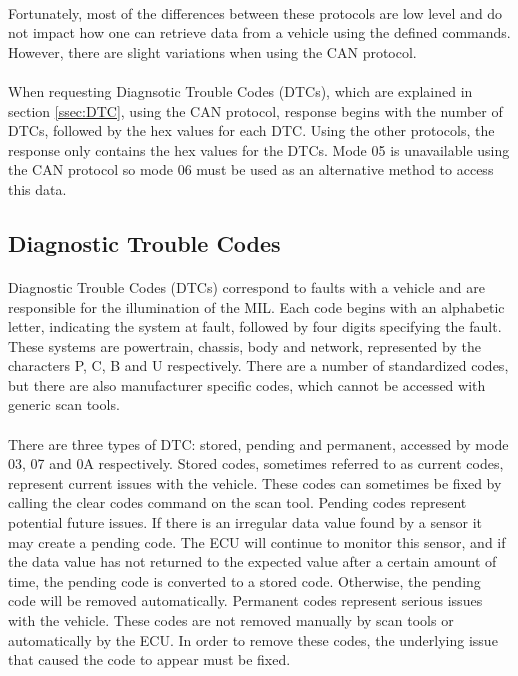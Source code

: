 {		\paragraph{}{
		Fortunately, most of the differences between these protocols are low level and do not impact how one can retrieve data from a vehicle using the defined commands. However, there are slight variations when using the CAN protocol.
		}
		\paragraph{}{
		 When requesting Diagnsotic Trouble Codes (DTCs), which are explained in section \ref{ssec:DTC}, using the CAN protocol, response begins with the number of DTCs, followed by the hex values for each DTC. Using the other protocols, the response only contains the hex values for the DTCs. Mode 05 is unavailable using the CAN protocol so mode 06 must be used as an alternative method to access this data.
		}	
	}
	\subsection{Diagnostic Trouble Codes}{
		\paragraph{}{
		Diagnostic Trouble Codes (DTCs) correspond to faults with a vehicle and are responsible for the illumination of the MIL. Each code begins with an alphabetic letter, indicating the system at fault, followed by four digits specifying the fault. These systems are powertrain, chassis, body and network, represented by the characters P, C, B and U respectively. There are a number of standardized codes, but there are also manufacturer specific codes, which cannot be accessed with generic scan tools.
		}
		\paragraph{}{
		There are three types of DTC: stored, pending and permanent, accessed by mode 03, 07 and 0A respectively. Stored codes, sometimes referred to as current codes, represent current issues with the vehicle. These codes can sometimes be fixed by calling the clear codes command on the scan tool. Pending codes represent potential future issues. If there is an irregular data value found by a sensor it may create a pending code. The ECU will continue to monitor this sensor, and if the data value has not returned to the expected value after a certain amount of time, the pending code is converted to a stored code. Otherwise, the pending code will be removed automatically. Permanent codes represent serious issues with the vehicle. These codes are not removed manually by scan tools or automatically by the ECU. In order to remove these codes, the underlying issue that caused the code to appear must be fixed.
		}			
	}
	\label{ssec:DTC}
